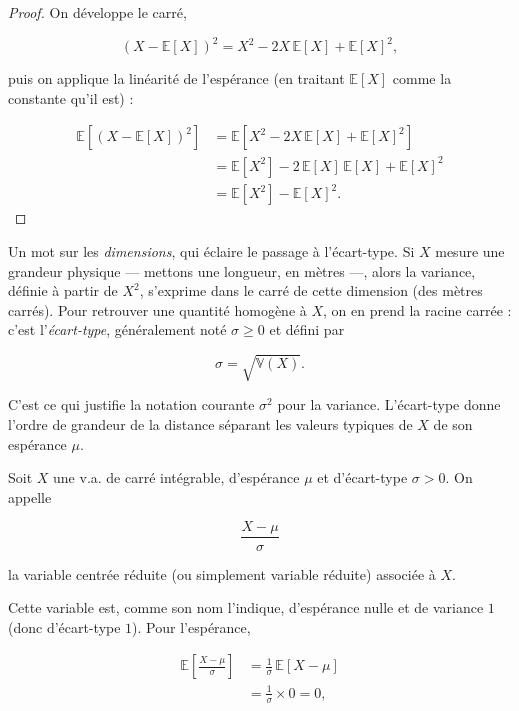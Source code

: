\begin{proof}
On développe le carré,

$$
(X - \mathbb{E}[X])^2 = X^2 - 2X\, \mathbb{E}[X] + \mathbb{E}[X]^2,
$$

puis on applique la linéarité de l'espérance (en traitant $\mathbb{E}[X]$ comme la constante qu'il est) :

\begin{align*}
\mathbb{E}[(X - \mathbb{E}[X])^2] &= \mathbb{E}[X^2 - 2X\, \mathbb{E}[X] + \mathbb{E}[X]^2] \\
&= \mathbb{E}[X^2] - 2\, \mathbb{E}[X]\, \mathbb{E}[X] + \mathbb{E}[X]^2 \\
&= \mathbb{E}[X^2] - \mathbb{E}[X]^2.
\end{align*}
\end{proof}

Un mot sur les \emph{dimensions}, qui éclaire le passage à l'écart-type. Si $X$ mesure une grandeur physique — mettons une longueur, en mètres —, alors la variance, définie à partir de $X^2$, s'exprime dans le carré de cette dimension (des mètres carrés). Pour retrouver une quantité homogène à $X$, on en prend la racine carrée : c'est l'\emph{écart-type}, généralement noté $\sigma \geq 0$ et défini par

$$
\sigma = \sqrt{\mathbb{V}(X)}.
$$

C'est ce qui justifie la notation courante $\sigma^2$ pour la variance. L'écart-type donne l'ordre de grandeur de la distance séparant les valeurs typiques de $X$ de son espérance $\mu$.

\medskip

\begin{mdframed}
\begin{definition}
Soit $X$ une v.a. de carré intégrable, d'espérance $\mu$ et d'écart-type $\sigma > 0$. On appelle

$$
\frac{X - \mu}{\sigma}
$$

la variable centrée réduite (ou simplement variable réduite) associée à $X$.
\end{definition}
\end{mdframed}

Cette variable est, comme son nom l'indique, d'espérance nulle et de variance $1$ (donc d'écart-type $1$). Pour l'espérance,

\begin{align*}
\mathbb{E}\!\left[ \frac{X - \mu}{\sigma} \right] &= \frac{1}{\sigma}\, \mathbb{E}[X - \mu] \\
&= \frac{1}{\sigma} \times 0 = 0,
\end{align*}


